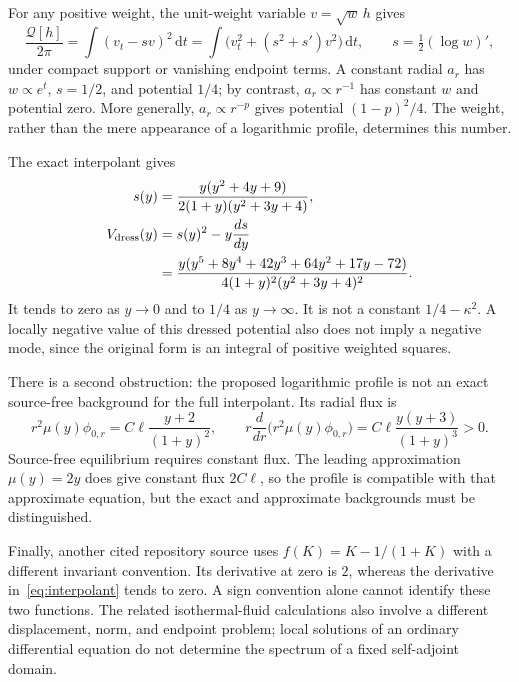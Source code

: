 \documentclass[11pt,letterpaper]{article}
\newcommand{\dd}{\,\mathrm d}
\theoremstyle{definition}
\numberwithin{equation}{section}
\begin{document}
For any positive weight, the unit-weight variable $v=\sqrt w\,h$ gives
\begin{equation}
 \frac{\mathcal Q[h]}{2\pi}=\int(v_t-sv)^2\dd t
 =\int\bigl(v_t^2+(s^2+s')v^2\bigr)\dd t,
 \qquad s=\tfrac12(\log w)',
 \label{eq:weight-potential}
\end{equation}
under compact support or vanishing endpoint terms. A constant radial
$a_r$ has $w\propto e^t$, $s=1/2$, and potential $1/4$; by contrast,
$a_r\propto r^{-1}$ has constant $w$ and potential zero. More generally,
$a_r\propto r^{-p}$ gives potential $(1-p)^2/4$. The weight, rather
than the mere appearance of a logarithmic profile, determines this number.

The exact interpolant gives
\begin{align}
 s(y)&=\frac{y(y^2+4y+9)}{2(1+y)(y^2+3y+4)},\notag\\
 V_{\rm dress}(y)&=s(y)^2-y\frac{ds}{dy}\notag\\
 &=\frac{y(y^5+8y^4+42y^3+64y^2+17y-72)}
              {4(1+y)^2(y^2+3y+4)^2}.
 \label{eq:dressed-source}
\end{align}
It tends to zero as $y\to0$ and to $1/4$ as $y\to\infty$. It is not a
constant $1/4-\kappa^2$. A locally negative value of this dressed
potential also does not imply a negative mode, since the original form
is an integral of positive weighted squares.

There is a second obstruction: the proposed logarithmic profile is not
an exact source-free background for the full interpolant. Its radial flux
is
\begin{equation}
 r^2\mu(y)\phi_{0,r}=C\ell\frac{y+2}{(1+y)^2},\qquad
 r\frac{d}{dr}\bigl(r^2\mu(y)\phi_{0,r}\bigr)
 =C\ell\frac{y(y+3)}{(1+y)^3}>0.
 \label{eq:flux-obstruction}
\end{equation}
Source-free equilibrium requires constant flux. The leading approximation
$\mu(y)=2y$ does give constant flux $2C\ell$, so the profile is compatible
with that approximate equation, but the exact and approximate backgrounds
must be distinguished.

Finally, another cited repository source uses $f(K)=K-1/(1+K)$ with a
different invariant convention. Its derivative at zero is $2$, whereas
the derivative in~\eqref{eq:interpolant} tends to zero. A sign convention
alone cannot identify these two functions. The related isothermal-fluid
calculations also involve a different displacement, norm, and endpoint
problem; local solutions of an ordinary differential equation do not
determine the spectrum of a fixed self-adjoint domain.
\end{document}
